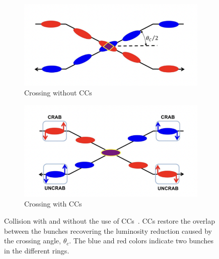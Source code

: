 \begin{figure}[!ht]
    \centering
    \begin{subfigure}[t]{0.45\textwidth}
        \centering
        \includegraphics[width=1\textwidth]{images/introduction/no_crab_crossing.png}
        \caption{Crossing without CCs}
    \end{subfigure}
    \hfill
    \begin{subfigure}[t]{0.45\textwidth}
        \centering
        \includegraphics[width=1\textwidth]{images/introduction/crab_crossing.png}
        \caption{Crossing with CCs}
    \end{subfigure}
    \hfill
     \caption{Collision with and without the use of CCs~\cite{Verdú-Andrés:2263119}. CCs restore the overlap between the bunches recovering the luminosity reduction caused by the crossing angle, $\theta_c$. The blue and red colors indicate two bunches in the different rings.} 
     \label{fig:crossing_with_and_without_CCs}
 \end{figure}


